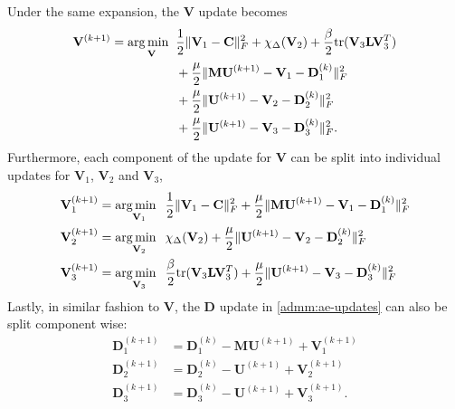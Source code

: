 Under the same expansion, the $\mathbf{V}$ update becomes
\begin{equation*}
  \begin{aligned}
    \mathbf{V}^{(k+1)} = \operatorname*{arg\,min \;\;}_{\mathbf{V}}  &  \frac{1}{2} \|\mathbf{V}_1 - \mathbf{C} \|_F^2 + \chi_{\Delta}(\mathbf{V}_2) + \frac{\beta}{2}\text{tr}(\mathbf{V}_3\mathbf{L}\mathbf{V}_3^T) \\ 
    & + \frac{\mu}{2} \|\mathbf{MU}^{(k+1)} - \mathbf{V}_1 - \mathbf{D}_1^{(k)}\|_F^2 \\
    & + \frac{\mu}{2} \|\mathbf{U}^{(k+1)} - \mathbf{V}_2 - \mathbf{D}_2^{(k)}\|_F^2 \\
    & + \frac{\mu}{2} \|\mathbf{U}^{(k+1)} - \mathbf{V}_3 - \mathbf{D}_3^{(k)}\|_F^2.
  \end{aligned}
\end{equation*}
Furthermore, each component of the update for $\mathbf{V}$ can be split into individual updates for $\mathbf{V}_1$, $\mathbf{V}_2$ and $\mathbf{V}_3$,
\begin{equation}
  \label{admm:ae-updates-v}
  \begin{aligned}
    \mathbf{V}_1^{(k+1)} &= \operatorname*{arg\,min \;\;}_{\mathbf{V}_1} \frac{1}{2} \|\mathbf{V}_1 - \mathbf{C} \|_F^2 + \frac{\mu}{2} \|\mathbf{MU}^{(k+1)} - \mathbf{V}_1 - \mathbf{D}_1^{(k)}\|_F^2 \\
    \mathbf{V}_2^{(k+1)} &= \operatorname*{arg\,min \;\;}_{\mathbf{V}_2} \chi_{\Delta}(\mathbf{V}_2) + \frac{\mu}{2} \|\mathbf{U}^{(k+1)} - \mathbf{V}_2 - \mathbf{D}_2^{(k)}\|_F^2 \\
    \mathbf{V}_3^{(k+1)} &= \operatorname*{arg\,min \;\;}_{\mathbf{V}_3} \frac{\beta}{2}\text{tr}(\mathbf{V}_3\mathbf{L}\mathbf{V}_3^T) + \frac{\mu}{2} \|\mathbf{U}^{(k+1)} - \mathbf{V}_3 - \mathbf{D}_3^{(k)}\|_F^2
  \end{aligned}
\end{equation}
Lastly, in similar fashion to $\mathbf{V}$, the $\mathbf{D}$ update in \eqref{admm:ae-updates} can also be split component wise:
\begin{equation}
  \label{admm:ae-updates-d}
  \begin{aligned}
    \mathbf{D}_1^{(k+1)} &= \mathbf{D}_1^{(k)} - \mathbf{MU}^{(k+1)} + \mathbf{V}_1^{(k+1)} \\
    \mathbf{D}_2^{(k+1)} &= \mathbf{D}_2^{(k)} - \mathbf{U}^{(k+1)} + \mathbf{V}_2^{(k+1)} \\
    \mathbf{D}_3^{(k+1)} &= \mathbf{D}_3^{(k)} - \mathbf{U}^{(k+1)} + \mathbf{V}_3^{(k+1)}.
  \end{aligned}
\end{equation}

